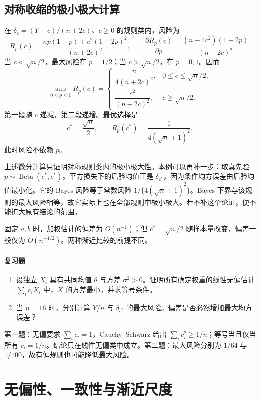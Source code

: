 \subsection{对称收缩的极小极大计算}
在 $\delta_c=(Y+c)/(n+2c)$、$c\ge0$ 的规则类内，风险为
\[
 R_p(c)=\frac{np(1-p)+c^2(1-2p)^2}{(n+2c)^2},
 \qquad
 \frac{\partial R_p(c)}{\partial p}
 =\frac{(n-4c^2)(1-2p)}{(n+2c)^2}.
\]
当 $c<\sqrt n/2$，最大风险在 $p=1/2$；当 $c>\sqrt n/2$，在 $p=0,1$。因而
\[
 \sup_{0\le p\le1}R_p(c)=
 \begin{cases}
 \dfrac{n}{4(n+2c)^2},&0\le c\le\sqrt n/2,\\[5pt]
 \dfrac{c^2}{(n+2c)^2},&c\ge\sqrt n/2.
 \end{cases}
\]
第一段随 $c$ 递减，第二段递增。最优选择是
\[
 c^*=\frac{\sqrt n}{2},\qquad
 R_p(c^*)=\frac1{4(\sqrt n+1)^2},
\]
此时风险不依赖 $p$。

\begin{notebox}
上述微分计算只证明对称规则类内的极小极大性。本例可以再补一步：取真先验 $p\sim\operatorname{Beta}(c^*,c^*)$。平方损失下的后验均值正是 $\delta_{c^*}$，因为条件均方误差由后验均值最小化。它的 Bayes 风险等于常数风险 $1/\{4(\sqrt n+1)^2\}$。Bayes 下界与该规则的最大风险相等，故它实际上也在全部规则中极小极大。若不补这个论证，便不能扩大原有结论的范围。
\end{notebox}

固定 $a,b$ 时，加权估计的偏差为 $O(n^{-1})$；但 $c^*=\sqrt n/2$ 随样本量改变，偏差一般仅为 $O(n^{-1/2})$。两种渐近比较的前提不同。

\paragraph{复习题}
\begin{enumerate}
 \item 设独立 $X_i$ 具有共同均值 $\theta$ 与方差 $\sigma^2>0$。证明所有确定权重的线性无偏估计 $\sum_i c_iX_i$ 中，$\bar X$ 的方差最小，并求等号条件。
 \item 当 $n=16$ 时，分别计算 $Y/n$ 与 $\delta_{c^*}$ 的最大风险。偏差是否必然增加最大均方误差？
\end{enumerate}
\begin{notebox}[答案线索]
第一题：无偏要求 $\sum_i c_i=1$，Cauchy--Schwarz 给出 $\sum_i c_i^2\ge1/n$；等号当且仅当所有 $c_i=1/n$。结论只在线性无偏类中成立。第二题：最大风险分别为 $1/64$ 与 $1/100$，故有偏规则也可能降低最大风险。
\end{notebox}

\section{无偏性、一致性与渐近尺度}

